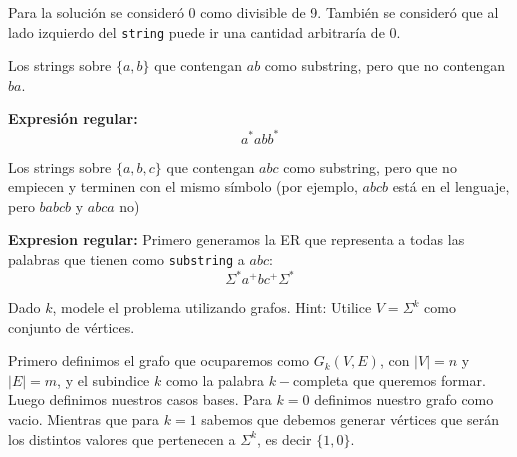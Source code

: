 \documentclass[letterpaper,10pt,table, dvipsnames]{article}
\begin{document}
Para la solución se consideró 0 como divisible de 9. También se consideró que al lado izquierdo del \texttt{string} puede ir una cantidad arbitraría de 0.\\

\begin{tcolorbox}
 Los strings sobre $\{a,b\}$ que contengan $ab$ como substring, pero que no contengan $ba$.
\end{tcolorbox}

\begin{center}
\end{center}

\textbf{Expresión regular:} $$ a^* ab b^* $$

\begin{tcolorbox}
  Los strings sobre $\{a,b,c\}$ que contengan $abc$ como substring, pero que no empiecen y terminen con el mismo símbolo (por ejemplo, $abcb$ está en el lenguaje, pero $babcb$ y $abca$ no)
\end{tcolorbox}

\textbf{Expresion regular:} Primero generamos la ER que representa a todas las palabras que tienen como \texttt{substring} a $abc$:
$$\Sigma^* a^+ b c^+ \Sigma^*$$



\newpage

\begin{tcolorbox}
 Dado $k$, modele el problema utilizando grafos. Hint: Utilice $V = \Sigma^k$ como conjunto de vértices.
\end{tcolorbox}

Primero definimos el grafo que ocuparemos como $G_{k}(V,E)$, con $|V| = n$ y $|E| = m$, y el subindice $k$ como la palabra $k-$completa que queremos formar. Luego definimos nuestros casos bases. Para $k=0$ definimos nuestro grafo como vacio. Mientras que para $k=1$ sabemos que debemos generar vértices que serán los distintos valores que pertenecen a $\Sigma^k$, es decir $\{1,0\}$. \\
\end{document}
